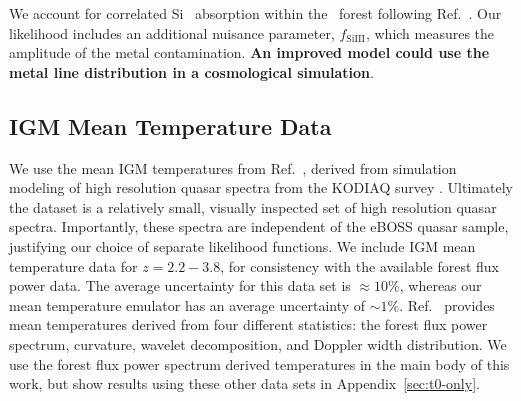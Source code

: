 We account for correlated Si~{} absorption within the \lya~forest following Ref.~\cite{2006ApJS..163...80M}.
Our likelihood includes an additional nuisance parameter, $f_\mathrm{SiIII}$, which measures the amplitude of the metal contamination. \textbf{An improved model could use the metal line distribution in a cosmological simulation}.

\subsection{IGM Mean Temperature Data}\label{sec:t0data}

We use the mean IGM temperatures from Ref.~\cite{2021MNRAS.506.4389G}, derived from simulation modeling of high resolution quasar spectra from the KODIAQ survey \cite{2017AJ....154..114O}.
Ultimately the dataset is a relatively small, visually inspected set of high resolution quasar spectra.
Importantly, these spectra are independent of the eBOSS quasar sample, justifying our choice of separate likelihood functions.
We include IGM mean temperature data for $z=2.2-3.8$, for consistency with the available \lya forest flux power data.
The average uncertainty for this data set is $\approx10\%$, whereas our mean temperature emulator has an average uncertainty of $\sim 1\%$.
Ref.~\cite{2021MNRAS.506.4389G} provides mean temperatures derived from four different statistics: the \lya forest flux power spectrum, curvature, wavelet decomposition, and Doppler width distribution.
We use the \lya forest flux power spectrum derived temperatures in the main body of this work, but show results using these other data sets in Appendix~\ref{sec:t0-only}.

